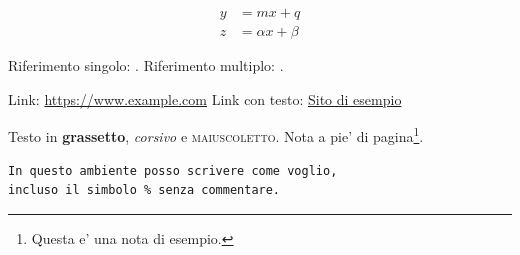 \begin{align}
y &= mx + q \\
z &= \alpha x + \beta
\end{align}

Riferimento singolo: \cite{K1}.
Riferimento multiplo: \cite{K1,K2,K3}.

Link: \url{https://www.example.com}
Link con testo: \href{https://www.example.com}{Sito di esempio}

Testo in \textbf{grassetto}, \textit{corsivo} e \textsc{maiuscoletto}.
Nota a pie' di pagina\footnote{Questa e' una nota di esempio.}.

\begin{verbatim}
In questo ambiente posso scrivere come voglio,
incluso il simbolo % senza commentare.
\end{verbatim}



